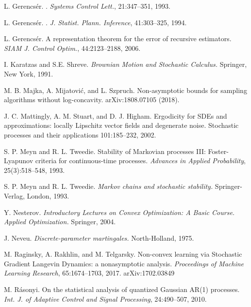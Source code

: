 \documentclass[a4paper]{article}
\begin{document}
\begin{thebibliography}{00}
 {L. Gerencs{\'e}r.}
.
\newblock\emph{Systems Control Lett.}, 21:347--351, 1993.

 {L. Gerencs{\'e}r.}
.
\newblock\emph{J. Statist. Plann. Inference}, 41:303--325, 1994.

 L. Gerencs\'er.
\newblock A representation theorem for the error of recursive estimators.
\newblock \emph{SIAM J. Control Optim.}, 44:2123--2188, 2006.


I. Karatzas and S.E. Shreve.
\newblock \emph{Brownian Motion and Stochastic Calculus.}
\newblock Springer, New York, 1991.

 M. B. Majka, A. Mijatovi\'{c}, and L. Szpruch. 
\newblock Non-asymptotic bounds for sampling algorithms without log-concavity. 
\newblock arXiv:1808.07105 (2018).

 J. C. Mattingly, A. M. Stuart, and D. J. Higham.
\newblock Ergodicity for SDEs and approximations: locally Lipschitz vector fields and degenerate noise.
\newblock Stochastic processes and their applications 101:185--232, 2002.

S. P. Meyn and R. L. Tweedie.
\newblock Stability of Markovian processes III: Foster-Lyapunov criteria for continuous-time processes.
\newblock \emph{Advances in Applied Probability}, 25(3):518--548, 1993.

S. P. Meyn and R. L. Tweedie.
\newblock \emph{Markov chains and stochastic stability.}
\newblock Springer-Verlag, London, 1993.

 Y. Nesterov.
\newblock\emph{Introductory Lectures on Convex Optimization: A Basic
Course. Applied Optimization.}
\newblock Springer, 2004.

 J. Neveu.
\newblock\emph{Discrete-parameter martingales.}
\newblock North-Holland, 1975.

M. Raginsky, A. Rakhlin, and M. Telgarsky.
\newblock Non-convex learning via Stochastic Gradient Langevin Dynamics: a nonasymptotic analysis.
\newblock \emph{Proceedings of Machine Learning Research}, 65:1674--1703, 2017. \newblock arXiv:1702.03849

 M. R\'asonyi.
\newblock On the statistical analysis of
quantized Gaussian AR(1) processes.
\newblock\emph{Int. J. of Adaptive Control and Signal Processing}, {24}:490--507, 2010.


\end{thebibliography}
\end{document}
